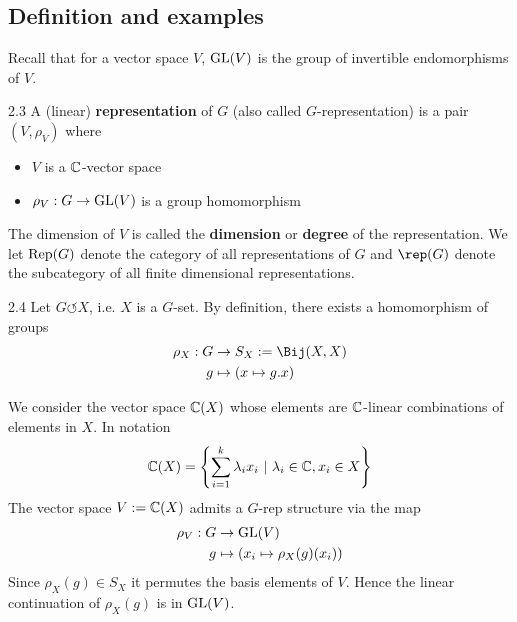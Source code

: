 \documentclass[twoside = false,	%
		headsepline,		%
		parskip = true,
		]{scrbook}						%
\begin{document}
    \subsection{Definition and examples}
        Recall that for a vector space $V$, $\mathrm{GL}(V)$ is the group of invertible endomorphisms of $V$.
        \begin{definition}{}{2.3}
            A (linear) \textbf{representation} of $G$ (also called $G$-representation) is a pair $(V,\rho_V)$ where
            \begin{itemize}
                \item $V$ is a $\mathbb C$-vector space
                \item $\rho_V: G \to \mathrm{GL}(V)$ is a group homomorphism
            \end{itemize}
            
            The dimension of $V$ is called the \textbf{dimension} or \textbf{degree} of the representation. We let $\mathrm{Rep}(G)$ denote the category of all representations of $G$ and $\rep(G)$ denote the subcategory of all finite dimensional representations.
        \end{definition}
        
        \begin{example}{}{2.4}
            Let $G \circlearrowleft X$, i.e. $X$ is a $G$-set. By definition, there exists a homomorphism of groups
            \begin{equation*}
            \begin{split}
                \rho_X: G &\to S_X:=\Bij(X,X) \\
                        g &\mapsto (x \mapsto g.x)
            \end{split}
            \end{equation*}
            
            We consider the vector space $\mathbb C(X)$ whose elements are $\mathbb C$-linear combinations of elements in $X$. In notation
            \begin{equation*}
                \mathbb C(X) = \left\{\sum_{i=1}^{k} \lambda_i x_i \ | \ \lambda_i \in \mathbb C, x_i \in X \right\}
            \end{equation*}
            The vector space $V:= \mathbb C(X)$ admits a $G$-rep structure via the map
            \begin{equation*}
            \begin{split}
                \rho_V: G &\to \mathrm{GL}(V) \\
                    g &\mapsto \left(x_i \mapsto \rho_X(g)(x_i)\right)
            \end{split}
            \end{equation*}
            Since $\rho_X(g) \in S_X$ it permutes the basis elements of $V$. Hence the linear continuation of $\rho_X(g)$ is in $\mathrm{GL}(V)$.
        \end{example}
        
\end{document}
